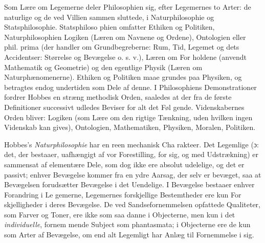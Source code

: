 \documentclass[12pt,a4paper]{book}
\begin{document}
Som Lære om Legemerne deler Philosophien sig, efter
Legemernes to Arter: de naturlige og de ved Villien sammen\-%
sluttede, i Naturphilosophie og Statsphilosophie. Statsphiloso\-%
phien omfatter Ethiken og Politiken, Naturphilosophien Logiken
(Læren om Navnene og Ordene), Ontologien eller phil. prima
(der handler om Grundbegreberne: Rum, Tid, Legemet og dets
Accidentser: Størrelse og Bevægelse o. s. v.), Læren om For\-%
holdene (anvendt Mathematik og Geometrie) og den egentlige
Physik (Læren om Naturphænomenerne). Ethiken og Politiken
maae grundes paa Physiken, og betragtes endog undertiden
som Dele af denne. I Philosophiens Demonstrationer fordrer
Hobbes en stræng methodisk Orden, saaledes at der fra de
første Definitioner successivt udledes Beviser for alt det Føl\-%
gende. Videnskabernes Orden bliver: Logiken (som Lære om
den rigtige Tænkning, uden hvilken ingen Videnskab kan gives),
Ontologien, Mathematiken, Physiken, Moralen, Politiken.

Hobbes's \emph{Naturphilosophie} har en reen mechanisk Cha\-%
rakteer. Det Legemlige (ɔ: det, der bestaaer, uafhængigt af
vor Forestilling, for sig, og med Udstrækning) er sammensat
af elementære Dele, som dog ikke ere absolut udelelige, og det
er passivt; enhver Bevægelse kommer fra en ydre Aarsag, der
selv er bevæget, saa at Bevægelsen forudsætter Bevægelse i
det Uendelige. I Bevægelse bestaaer enhver Forandring i Le\-%
gemerne, Legemernes forskjellige Bestemtheder ere kun For\-%
skjelligheder i deres Bevægelse. De ved Sandsefornemmelsen
opfattede Qualiteter, som Farver og Toner, ere ikke som saa\-%
danne i Objecterne, men kun i det \emph{individuelle}, fornem\-%
mende Subject som phantasmata; i Objecterne ere de kun
\setcounter{footnote}{0}%
som Arter af Bevægelse, om end alt Legemligt har Anlæg til
Fornemmelse i sig.
\end{document}
